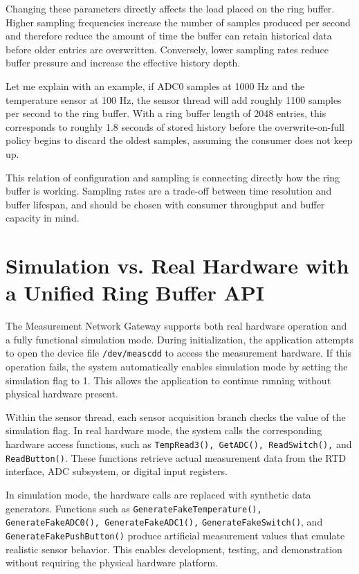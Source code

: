 Changing these parameters directly affects the load placed on the ring buffer. Higher sampling frequencies increase the number of samples produced per second and therefore reduce the amount of time the buffer can retain historical data before older entries are overwritten. Conversely, lower sampling rates reduce buffer pressure and increase the effective history depth.

Let me explain with an example, if ADC0 samples at 1000 Hz and the temperature sensor at 100 Hz, the sensor thread will add roughly 1100 samples per second to the ring buffer. With a ring buffer length of 2048 entries, this corresponds to roughly 1.8 seconds of stored history before the overwrite-on-full policy begins to discard the oldest samples, assuming the consumer does not keep up.

This relation of configuration and sampling is connecting directly how the ring buffer is working. Sampling rates are a trade-off between time resolution and buffer lifespan, and should be chosen with consumer throughput and buffer capacity in mind.

\section{Simulation vs. Real Hardware with a Unified Ring Buffer API}
The Measurement Network Gateway supports both real hardware operation and a fully functional simulation mode. During initialization, the application attempts to open the device file \texttt{/dev/meascdd} to access the measurement hardware. If this operation fails, the system automatically enables simulation mode by setting the simulation flag to 1. This allows the application to continue running without physical hardware present.

Within the sensor thread, each sensor acquisition branch checks the value of the simulation flag. In real hardware mode, the system calls the corresponding hardware access functions, such as \texttt{TempRead3(), GetADC(), ReadSwitch(),} and \texttt{ReadButton()}. These functions retrieve actual measurement data from the RTD interface, ADC subsystem, or digital input registers.

In simulation mode, the hardware calls are replaced with synthetic data generators. Functions such as \texttt{GenerateFakeTemperature(), GenerateFakeADC0(), GenerateFakeADC1(),} \texttt{GenerateFakeSwitch()}, and \texttt{GenerateFakePushButton()} produce artificial measurement values that emulate realistic sensor behavior. This enables development, testing, and demonstration without requiring the physical hardware platform.

